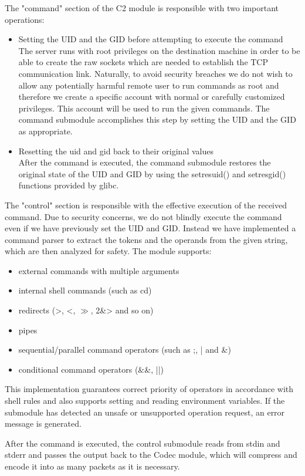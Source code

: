 The "command" section of the C2 module is responsible with two important operations:
\begin{itemize}
\item Setting the UID and the GID before attempting to execute the command \\
The server runs with root privileges on the destination machine in order to be
able to create the raw sockets which are needed to establish the TCP communication
link. Naturally, to avoid security breaches we do not wish to allow any potentially
harmful remote user to run commands as root and therefore we create a specific
account with normal or carefully customized privileges. This account will be used
to run the given commands. The command submodule accomplishes this step by setting
the UID and the GID as appropriate.
\item Resetting the uid and gid back to their original values \\
After the command is executed, the command submodule restores the original state
of the UID and GID by using the setresuid() and setresgid() functions provided by glibc.
\end{itemize}

The "control" section is responsible with the effective execution of the received
command. Due to security concerns, we do not blindly execute the command even if
we have previously set the UID and GID. Instead we have implemented a command parser
to extract the tokens and the operands from the given string, which are then
analyzed for safety. The module supports:
\begin{itemize}
\item external commands with multiple arguments
\item internal shell commands (such as cd)
\item redirects (>, <, $\gg$, 2\&> and so on)
\item pipes
\item sequential/parallel command operators (such as ;, | and \&)
\item conditional command operators (\&\&, ||) 
\end{itemize}

This implementation guarantees correct priority of operators in accordance with
shell rules and also supports setting and reading environment variables.
If the submodule has detected an unsafe or unsupported operation request,
an error message is generated.

After the command is executed, the control submodule reads from stdin and stderr
and passes the output back to the Codec module, which will compress and encode
it into as many packets as it is necessary.

